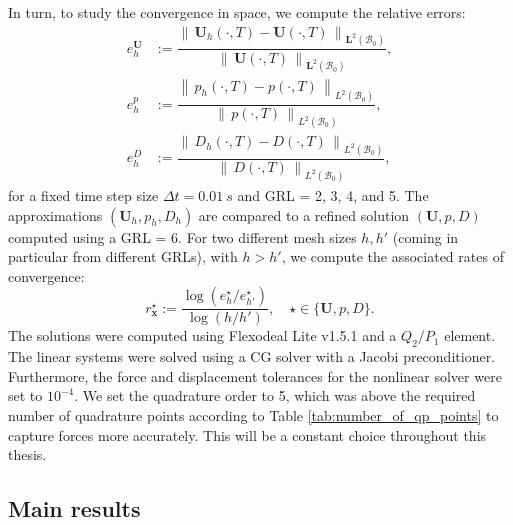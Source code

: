 \documentclass{sfuthesis}
\numberwithin{equation}{section}
\numberwithin{figure}{chapter}
\numberwithin{table}{chapter}
\theoremstyle{definition}
\def\*#1{{\mathbf{#1}}} %
\newcommand{\B}{\mathcal{B}}
\newcommand{\norm}[1]{{\left\| \, #1 \, \right\|}}
\begin{document}
In turn, to study the convergence in space, we compute the relative errors:
\begin{subequations}
    \begin{eqnarray}
        e^{\*U}_{h} &:= \dfrac{\norm{\*U_{h}(\cdot,T) - \*U(\cdot,T)}_{\*L^2(\B_0)}}{\norm{\*U(\cdot,T)}_{\*L^2(\B_0)}}, \\
        e^p_{h} &:= \dfrac{\norm{p_{h}(\cdot,T) - p(\cdot,T)}_{L^2(\B_0)}}{\norm{p(\cdot,T)}_{L^2(\B_0)}}, \\
        e^D_{h} &:= \dfrac{\norm{D_{h}(\cdot,T) - D(\cdot,T)}_{L^2(\B_0)}}{\norm{D(\cdot,T)}_{L^2(\B_0)}},
    \end{eqnarray}
\end{subequations}
for a fixed time step size $\Delta t = 0.01 \ \unit{s}$ and GRL = 2, 3, 4, and 5. The approximations $(\*U_h, p_h, D_h)$ are compared to a refined solution $(\*U,p,D)$ computed using a GRL = 6. For two different mesh sizes $h,h'$ (coming in particular from different GRLs), with $h>h'$, we compute the associated rates of convergence:
\begin{equation}
    r^\star_\*x := \dfrac{\log \left(e^\star_{h} / e^\star_{h'} \right)}{\log \left(h / h'  \right)}, \quad \star \in \{ \*U, p, D \}.
\end{equation}
The solutions were computed using Flexodeal Lite v1.5.1 and a $Q_2/P_1$ element. The linear systems were solved using a CG solver with a Jacobi preconditioner. Furthermore, the force and displacement tolerances for the nonlinear solver were set to $10^{-4}$. We set the quadrature order to 5, which was above the required number of quadrature points according to Table \ref{tab:number_of_qp_points} to capture forces more accurately. This will be a constant choice throughout this thesis.

\subsection{Main results}
\end{document}

